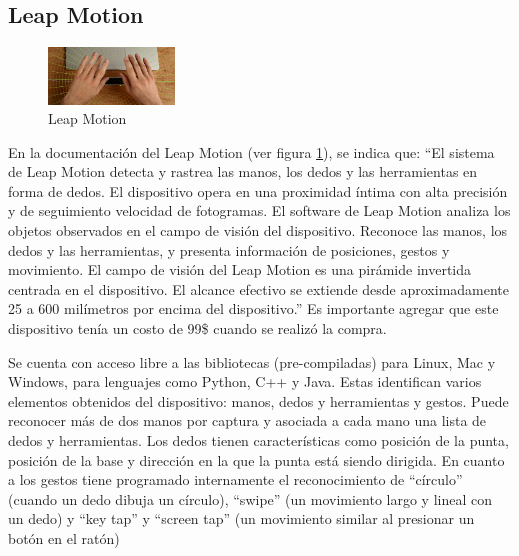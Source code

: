 \documentclass[letterpaper,journal,transmag]{IEEEtran}
\begin{document}
\subsection{Leap Motion}
\label{subsec:leap}
      \begin{figure}[ht]
         \includegraphics[width=0.3\textwidth]{leap}
         \caption{Leap Motion}
         \label{fig:leap}
      \end{figure}
En la documentación del Leap Motion \cite{_api_????} (ver figura
\ref{fig:leap}), se indica que: ``El sistema de Leap Motion detecta y rastrea
las manos, los dedos y las herramientas en forma de dedos. El dispositivo opera
en una proximidad íntima con alta precisión y de seguimiento velocidad de
fotogramas. El software de Leap Motion analiza los objetos observados en el
campo de visión del dispositivo. Reconoce las manos, los dedos y las
herramientas, y presenta información de posiciones, gestos y movimiento. El
campo de visión del Leap Motion es una pirámide invertida centrada en el
dispositivo. El alcance efectivo se extiende desde aproximadamente 25 a 600
milímetros por encima del dispositivo.'' Es importante agregar que este
dispositivo tenía un costo de 99\$ cuando se realizó la compra.

Se cuenta con acceso libre a las bibliotecas (pre-compiladas) para Linux, Mac y
Windows, para lenguajes como Python, C++ y Java. Estas identifican varios
elementos obtenidos del dispositivo: manos, dedos y herramientas y gestos.
Puede reconocer más de dos manos por captura y asociada a cada mano una lista
de dedos y herramientas. Los dedos tienen características como posición de la
punta, posición de la base y dirección en la que la punta está siendo dirigida.
En cuanto a los gestos tiene programado internamente el reconocimiento de
``círculo'' (cuando un dedo dibuja un círculo), ``swipe'' (un movimiento largo
y lineal con un dedo) y ``key tap'' y ``screen tap'' (un movimiento similar al
presionar un botón en el ratón)\\
\end{document}
